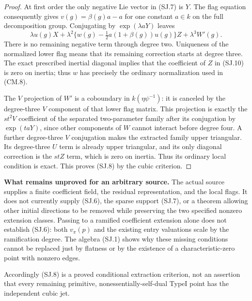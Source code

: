 \documentclass[11pt,a4paper]{article}
\theoremstyle{definition}
\renewcommand{\paragraph}[1]{\par\smallskip\noindent\textbf{#1}\quad\ignorespaces}
\begin{document}
\begin{proof}
At first order the only negative Lie vector in (SJ.7)
is $Y$.  The flag equation consequently gives
$v(g)=\beta(g)a-a$ for one constant $a\in k$ on the full
decomposition group.  Conjugating by $\exp(\lambda aY)$
leaves
\[
 \lambda u(g)X+\lambda^2
       \{w(g)-\tfrac12a(1+\beta(g))u(g)\}Z
                       +\lambda^3W'(g).                       \tag{SJ.10}
\]
There is no remaining negative term through degree two.
Uniqueness of the normalized lower flag means that its
remaining correction starts at degree three.
The exact prescribed inertial diagonal implies that
the coefficient of $Z$ in (SJ.10) is zero on inertia;
thus $w$ has precisely the ordinary normalization used
in (CM.8).

The $V$ projection of $W'$ is a coboundary in
$k(\eta\psi^{-1})$: it is canceled by the degree-three
$V$ component of that lower flag matrix.
This projection is exactly the $st^2V$ coefficient of
the separated two-parameter family after its conjugation
by $\exp(t aY)$, since other components of $W$ cannot
interact before degree four.
A further degree-three $V$ conjugation makes the
extracted family upper triangular.
Its degree-three $U$ term is already upper triangular,
and its only diagonal correction is the $stZ$ term,
which is zero on inertia.  Thus its ordinary local
condition is exact.  This proves (SJ.8) by the cubic
criterion.
\end{proof}

\paragraph{What remains unproved for an arbitrary source.}
The actual source supplies a finite coefficient field,
the residual representation, and the local flags.
It does not currently supply (SJ.6), the sparse support
(SJ.7), or a theorem allowing other initial directions
to be removed while preserving the two specified
nonzero extension classes.
Passing to a ramified coefficient extension alone does
not establish (SJ.6): both $v_\pi(p)$ and the existing
entry valuations scale by the ramification degree.
The algebra (SJ.1) shows why these missing conditions
cannot be replaced just by flatness or by the existence
of a characteristic-zero point with nonzero edges.

Accordingly (SJ.8) is a proved conditional extraction
criterion, not an assertion that every remaining
primitive, nonessentially-self-dual TypeI point has
the independent cubic jet.

\end{document}
